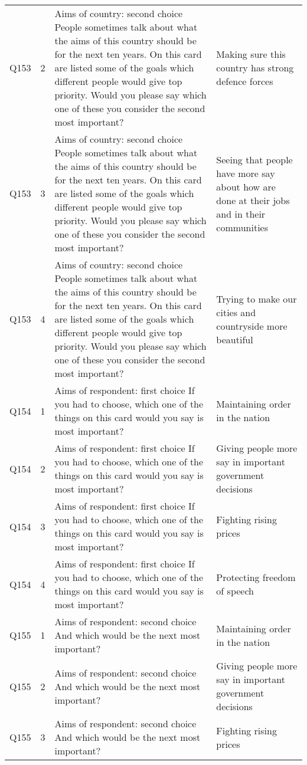 \begin{tabular}{lrll}
Q153 & 2 & Aims of country: second choice People sometimes talk about what the aims of this country should be for the next ten years. On this card are listed some of the goals which different people would give top priority. Would you please say which one of these you consider the second most important? & Making sure this country has strong defence forces \\
Q153 & 3 & Aims of country: second choice People sometimes talk about what the aims of this country should be for the next ten years. On this card are listed some of the goals which different people would give top priority. Would you please say which one of these you consider the second most important? & Seeing that people have more say about how are done at their jobs and in their communities \\
Q153 & 4 & Aims of country: second choice People sometimes talk about what the aims of this country should be for the next ten years. On this card are listed some of the goals which different people would give top priority. Would you please say which one of these you consider the second most important? & Trying to make our cities and countryside more beautiful \\
Q154 & 1 & Aims of respondent: first choice If you had to choose, which one of the things on this card would you say is most important? & Maintaining order in the nation \\
Q154 & 2 & Aims of respondent: first choice If you had to choose, which one of the things on this card would you say is most important? & Giving people more say in important government decisions \\
Q154 & 3 & Aims of respondent: first choice If you had to choose, which one of the things on this card would you say is most important? & Fighting rising prices \\
Q154 & 4 & Aims of respondent: first choice If you had to choose, which one of the things on this card would you say is most important? & Protecting freedom of speech \\
Q155 & 1 & Aims of respondent: second choice And which would be the next most important? & Maintaining order in the nation \\
Q155 & 2 & Aims of respondent: second choice And which would be the next most important? & Giving people more say in important government decisions \\
Q155 & 3 & Aims of respondent: second choice And which would be the next most important? & Fighting rising prices \\

\end{tabular}
